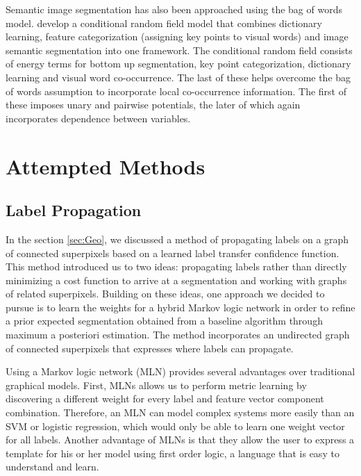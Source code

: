 \documentclass{article} %
\begin{document}
Semantic image segmentation has also been approached using the bag of words model. \cite{visualdictrene} develop a conditional random field model that combines dictionary learning, feature categorization (assigning key points to visual words) and image semantic segmentation into one framework. The conditional random field consists of energy terms for bottom up segmentation, key point categorization, dictionary learning and visual word co-occurrence. The last of these helps overcome the bag of words assumption to incorporate local co-occurrence information. The first of these imposes unary and pairwise potentials, the later of which again incorporates dependence between variables.

\section{Attempted Methods}
\label{sec:Attempt}
\subsection{Label Propagation}
\label{sec:AttemptLabProp}

	In the section \ref{sec:Geo}, we discussed a method of propagating labels on a graph of connected superpixels based on a learned label transfer confidence function. This method introduced us to two ideas: propagating labels rather than directly minimizing a cost function to arrive at a segmentation and working with graphs of related superpixels. Building on these ideas, one approach we decided to pursue is to learn the weights for a hybrid Markov logic network in order to refine a prior expected segmentation obtained from a baseline algorithm through maximum a posteriori estimation. The method incorporates an undirected graph of connected superpixels that expresses where labels can propagate.

	Using a Markov logic network (MLN) provides several advantages over traditional graphical models. First, MLNs allows us to perform metric learning by discovering a different weight for every label and feature vector component combination. Therefore, an MLN can model complex systems more easily than an SVM or logistic regression, which would only be able to learn one weight vector for all labels. Another advantage of MLNs is that they allow the user to express a template for his or her model using first order logic, a language that is easy to understand and learn.
\end{document}
